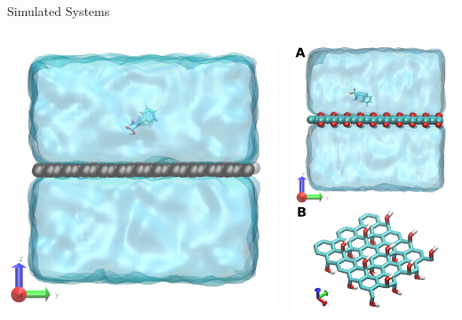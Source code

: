 \documentclass[aspectratio=169, compress]{beamer}
\begin{document}
\begin{frame}{Simulated Systems}
  \begin{columns}
    \begin{column}{.5\textwidth} \centering
      \includegraphics[width=.7\textwidth]{../../figures/Pristine_System.png}
    \end{column}
    \begin{column}{.5\textwidth}\centering
\includegraphics[width=.55\textwidth]{../../figures/Oxidized_System_and_Unit.png}
    \end{column}
  \end{columns}
\end{frame}
\end{document}
